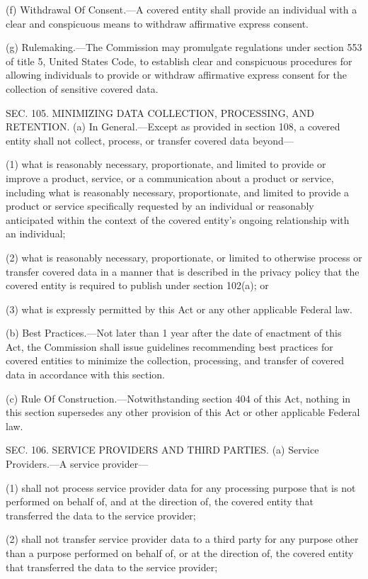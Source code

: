 (f) Withdrawal Of Consent.—A covered entity shall provide an individual with a clear and conspicuous means to withdraw affirmative express consent.

(g) Rulemaking.—The Commission may promulgate regulations under section 553 of title 5, United States Code, to establish clear and conspicuous procedures for allowing individuals to provide or withdraw affirmative express consent for the collection of sensitive covered data.


SEC. 105. MINIMIZING DATA COLLECTION, PROCESSING, AND RETENTION.
(a) In General.—Except as provided in section 108, a covered entity shall not collect, process, or transfer covered data beyond—

(1) what is reasonably necessary, proportionate, and limited to provide or improve a product, service, or a communication about a product or service, including what is reasonably necessary, proportionate, and limited to provide a product or service specifically requested by an individual or reasonably anticipated within the context of the covered entity’s ongoing relationship with an individual;

(2) what is reasonably necessary, proportionate, or limited to otherwise process or transfer covered data in a manner that is described in the privacy policy that the covered entity is required to publish under section 102(a); or

(3) what is expressly permitted by this Act or any other applicable Federal law.

(b) Best Practices.—Not later than 1 year after the date of enactment of this Act, the Commission shall issue guidelines recommending best practices for covered entities to minimize the collection, processing, and transfer of covered data in accordance with this section.

(c) Rule Of Construction.—Notwithstanding section 404 of this Act, nothing in this section supersedes any other provision of this Act or other applicable Federal law.


SEC. 106. SERVICE PROVIDERS AND THIRD PARTIES.
(a) Service Providers.—A service provider—

(1) shall not process service provider data for any processing purpose that is not performed on behalf of, and at the direction of, the covered entity that transferred the data to the service provider;

(2) shall not transfer service provider data to a third party for any purpose other than a purpose performed on behalf of, or at the direction of, the covered entity that transferred the data to the service provider;

